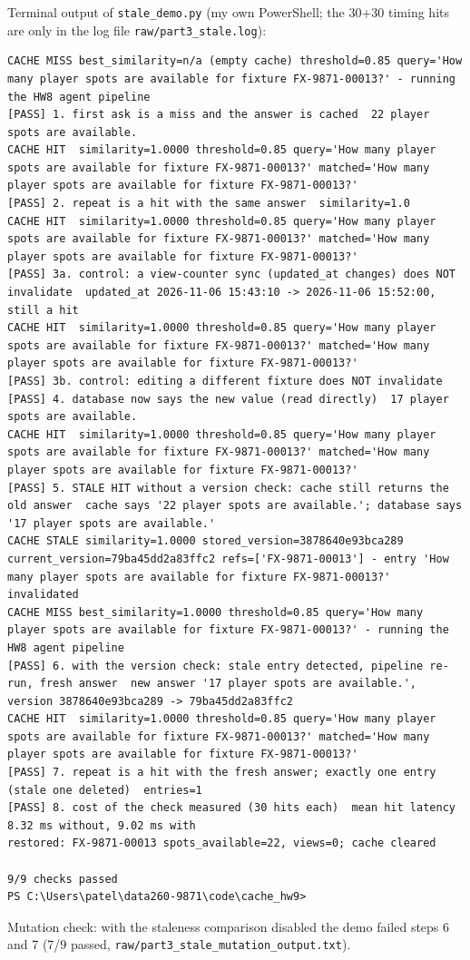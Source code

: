 \documentclass[11pt]{article}
\begin{document}
Terminal output of \texttt{stale\_\allowbreak{}demo.py} (my own PowerShell; the 30+30 timing hits are only in the log file \texttt{raw/\allowbreak{}part3\_\allowbreak{}stale.log}):

\begingroup\lstset{basicstyle=\ttfamily\tiny}
\begin{lstlisting}
CACHE MISS best_similarity=n/a (empty cache) threshold=0.85 query='How many player spots are available for fixture FX-9871-00013?' - running the HW8 agent pipeline
[PASS] 1. first ask is a miss and the answer is cached  22 player spots are available.
CACHE HIT  similarity=1.0000 threshold=0.85 query='How many player spots are available for fixture FX-9871-00013?' matched='How many player spots are available for fixture FX-9871-00013?'
[PASS] 2. repeat is a hit with the same answer  similarity=1.0
CACHE HIT  similarity=1.0000 threshold=0.85 query='How many player spots are available for fixture FX-9871-00013?' matched='How many player spots are available for fixture FX-9871-00013?'
[PASS] 3a. control: a view-counter sync (updated_at changes) does NOT invalidate  updated_at 2026-11-06 15:43:10 -> 2026-11-06 15:52:00, still a hit
CACHE HIT  similarity=1.0000 threshold=0.85 query='How many player spots are available for fixture FX-9871-00013?' matched='How many player spots are available for fixture FX-9871-00013?'
[PASS] 3b. control: editing a different fixture does NOT invalidate
[PASS] 4. database now says the new value (read directly)  17 player spots are available.
CACHE HIT  similarity=1.0000 threshold=0.85 query='How many player spots are available for fixture FX-9871-00013?' matched='How many player spots are available for fixture FX-9871-00013?'
[PASS] 5. STALE HIT without a version check: cache still returns the old answer  cache says '22 player spots are available.'; database says '17 player spots are available.'
CACHE STALE similarity=1.0000 stored_version=3878640e93bca289 current_version=79ba45dd2a83ffc2 refs=['FX-9871-00013'] - entry 'How many player spots are available for fixture FX-9871-00013?' invalidated
CACHE MISS best_similarity=1.0000 threshold=0.85 query='How many player spots are available for fixture FX-9871-00013?' - running the HW8 agent pipeline
[PASS] 6. with the version check: stale entry detected, pipeline re-run, fresh answer  new answer '17 player spots are available.', version 3878640e93bca289 -> 79ba45dd2a83ffc2
CACHE HIT  similarity=1.0000 threshold=0.85 query='How many player spots are available for fixture FX-9871-00013?' matched='How many player spots are available for fixture FX-9871-00013?'
[PASS] 7. repeat is a hit with the fresh answer; exactly one entry (stale one deleted)  entries=1
[PASS] 8. cost of the check measured (30 hits each)  mean hit latency 8.32 ms without, 9.02 ms with
restored: FX-9871-00013 spots_available=22, views=0; cache cleared

9/9 checks passed
PS C:\Users\patel\data260-9871\code\cache_hw9>
\end{lstlisting}
\endgroup
Mutation check: with the staleness comparison disabled the demo failed steps 6 and 7 (7/9 passed, \texttt{raw/\allowbreak{}part3\_\allowbreak{}stale\_\allowbreak{}mutation\_\allowbreak{}output.txt}).
\end{document}
